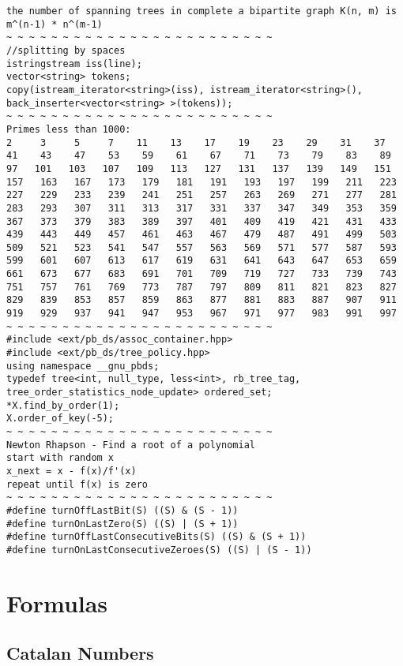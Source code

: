 \documentclass[8pt, oneside]{extarticle}
\begin{document}
\begin{multicols}{3}
\begin{lstlisting}
the number of spanning trees in complete a bipartite graph K(n, m) is m^(n-1) * n^(m-1)
~ ~ ~ ~ ~ ~ ~ ~ ~ ~ ~ ~ ~ ~ ~ ~ ~ ~ ~ ~ ~ ~ ~ ~
//splitting by spaces
istringstream iss(line);
vector<string> tokens;
copy(istream_iterator<string>(iss), istream_iterator<string>(), back_inserter<vector<string> >(tokens));
~ ~ ~ ~ ~ ~ ~ ~ ~ ~ ~ ~ ~ ~ ~ ~ ~ ~ ~ ~ ~ ~ ~ ~
Primes less than 1000:
2     3     5     7    11    13    17    19    23    29    31    37
41    43    47    53    59    61    67    71    73    79    83    89
97   101   103   107   109   113   127   131   137   139   149   151
157   163   167   173   179   181   191   193   197   199   211   223
227   229   233   239   241   251   257   263   269   271   277   281
283   293   307   311   313   317   331   337   347   349   353   359
367   373   379   383   389   397   401   409   419   421   431   433
439   443   449   457   461   463   467   479   487   491   499   503
509   521   523   541   547   557   563   569   571   577   587   593
599   601   607   613   617   619   631   641   643   647   653   659
661   673   677   683   691   701   709   719   727   733   739   743
751   757   761   769   773   787   797   809   811   821   823   827
829   839   853   857   859   863   877   881   883   887   907   911
919   929   937   941   947   953   967   971   977   983   991   997
~ ~ ~ ~ ~ ~ ~ ~ ~ ~ ~ ~ ~ ~ ~ ~ ~ ~ ~ ~ ~ ~ ~ ~
#include <ext/pb_ds/assoc_container.hpp>
#include <ext/pb_ds/tree_policy.hpp>
using namespace __gnu_pbds;
typedef tree<int, null_type, less<int>, rb_tree_tag, tree_order_statistics_node_update> ordered_set;
*X.find_by_order(1);
X.order_of_key(-5);
~ ~ ~ ~ ~ ~ ~ ~ ~ ~ ~ ~ ~ ~ ~ ~ ~ ~ ~ ~ ~ ~ ~ ~
Newton Rhapson - Find a root of a polynomial
start with random x
x_next = x - f(x)/f'(x)
repeat until f(x) is zero
~ ~ ~ ~ ~ ~ ~ ~ ~ ~ ~ ~ ~ ~ ~ ~ ~ ~ ~ ~ ~ ~ ~ ~
#define turnOffLastBit(S) ((S) & (S - 1))
#define turnOnLastZero(S) ((S) | (S + 1))
#define turnOffLastConsecutiveBits(S) ((S) & (S + 1))
#define turnOnLastConsecutiveZeroes(S) ((S) | (S - 1))
\end{lstlisting}

\section{Formulas}

\subsection{Catalan Numbers}


\end{multicols}
\end{document}
